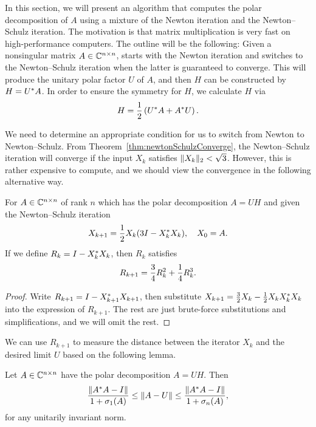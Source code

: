 \documentclass[12pt]{article}
\begin{document}
In this section, we will present an algorithm that computes the polar decomposition of $A$ using a mixture of the Newton iteration and the Newton--Schulz iteration. The motivation is that matrix multiplication is very fast on high-performance computers. The outline will be the following: Given a nonsingular matrix $A\in\mathbb{C}^{n\times n}$, starts with the Newton iteration and switches to the Newton--Schulz iteration when the latter is guaranteed to converge. This will produce the unitary polar factor $U$ of $A$, and then $H$ can be constructed by $H = U^* A$. In order to ensure the symmetry for $H$, we calculate $H$ via
\begin{equation}
    \notag 
    H = \frac{1}{2}\left(U^* A + A^* U\right).
\end{equation}

We need to determine an appropriate condition for us to switch from Newton to Newton--Schulz. From Theorem~\ref{thm:newtonSchulzConverge}, the Newton--Schulz iteration will converge if the input $X_k$ satisfies $\|{X_k}\|_2 < \sqrt{3}$. However, this is rather expensive to compute, and we should view the convergence in the following alternative way.

\begin{theorem}
    \label{thm:Conv-in-R}
    For $A\in\mathbb{C}^{n\times n}$ of rank $n$ which has the polar decomposition $A=UH$ and given the Newton--Schulz iteration 
    \begin{equation}
        \notag 
        X_{k+1} = \frac{1}{2}X_k(3I - X_k^* X_k), \quad X_0 = A.
    \end{equation}
    If we define $R_k = I - X_k^* X_k$, then $R_k$ satisfies
    \begin{equation}
        \notag
        R_{k+1} = \frac{3}{4}R_k^2 + \frac{1}{4}R_k^3.
    \end{equation}
\end{theorem}

\begin{proof}
    Write $R_{k+1} = I - X_{k+1}^* X_{k+1}$, then substitute $X_{k+1} = \frac{3}{2} X_k - \frac{1}{2}X_kX_k^* X_k$ into the expression of $R_{k+1}$. The rest are just brute-force substitutions and simplifications, and we will omit the rest.
\end{proof}

We can use $R_{k+1}$ to measure the distance between the iterator $X_k$ and the desired limit $U$ based on the following lemma.

\begin{lemma}
    Let $A\in\mathbb{C}^{n\times n}$ have the polar decomposition $A=UH$. Then 
    \begin{equation}
        \label{eq:DistEquiv} 
        \frac{\|{A^* A - I}\|}{1+\sigma_1(A)} \leq \|{A-U}\| \leq 
        \frac{\|{A^* A - I}\|}{1+\sigma_n(A)},
    \end{equation}
    for any unitarily invariant norm.
\end{lemma}
\end{document}
